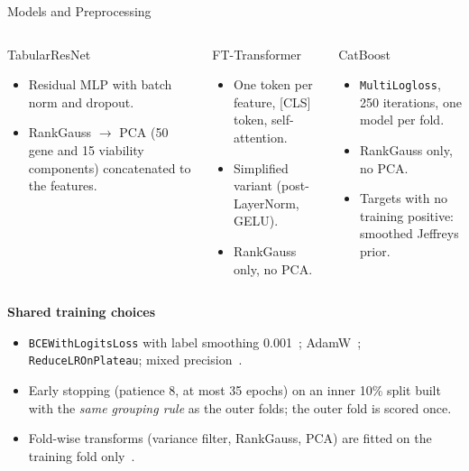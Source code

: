 \documentclass[aspectratio=169,10pt]{beamer}
\begin{document}
\begin{frame}{Models and Preprocessing}
\small
\begin{columns}[T,onlytextwidth]
\begin{block}{TabularResNet}
\begin{itemize}
  \item Residual MLP with batch norm and dropout.
  \item RankGauss $\rightarrow$ PCA (50 gene and 15 viability components) concatenated to the features.
\end{itemize}
\end{block}
\begin{block}{FT-Transformer~\cite{ft}}
\begin{itemize}
  \item One token per feature, [CLS] token, self-attention.
  \item Simplified variant (post-LayerNorm, GELU).
  \item RankGauss only, no PCA.
\end{itemize}
\end{block}
\begin{block}{CatBoost~\cite{cat}}
\begin{itemize}
  \item \texttt{MultiLogloss}, 250 iterations, one model per fold.
  \item RankGauss only, no PCA.
  \item Targets with no training positive: smoothed Jeffreys prior.
\end{itemize}
\end{block}
\end{columns}
\vspace{0.4em}
\textbf{Shared training choices}
\begin{itemize}
  \item \texttt{BCEWithLogitsLoss} with label smoothing 0.001~\cite{ls}; AdamW~\cite{adamw}; \texttt{ReduceLROnPlateau}; mixed precision~\cite{amp}.
  \item Early stopping (patience 8, at most 35 epochs) on an inner 10\% split built with the \emph{same grouping rule} as the outer folds; the outer fold is scored once.
  \item Fold-wise transforms (variance filter, RankGauss, PCA) are fitted on the training fold only~\cite{sklearn}.
\end{itemize}
\end{frame}
\end{document}

